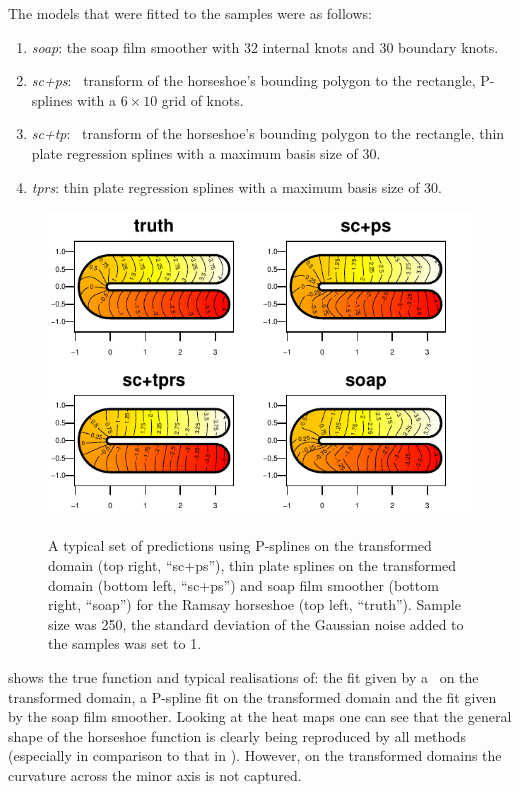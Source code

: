 The models that were fitted to the samples were as follows:
\begin{enumerate}
\item \textit{soap}: the soap film smoother with 32 internal knots and 30 boundary knots.
\item \textit{sc+ps}: \sch\ transform of the horseshoe's bounding polygon to the rectangle, P-splines with a $6 \times 10$ grid of knots.
\item \textit{sc+tp}: \sch\ transform of the horseshoe's bounding polygon to the rectangle, thin plate regression splines with a maximum basis size of 30.
\item \textit{tprs}: thin plate regression splines with a maximum basis size of 30.
\end{enumerate}

\begin{figure}
\centering
\includegraphics[width=6in]{sc/figs/compsmooth.pdf} \\
\caption{A typical set of predictions using P-splines on the transformed domain (top right, ``sc+ps''), thin plate splines on the transformed domain (bottom left, ``sc+ps'') and soap film smoother (bottom right, ``soap'') for the Ramsay horseshoe (top left, ``truth''). Sample size was 250, the standard deviation of the Gaussian noise added to the samples was set to 1.}
\label{compsmooth}
\end{figure}

 shows the true function and typical realisations of: the fit given by a \tprs\ on the transformed domain, a P-spline fit on the transformed domain and the fit given by the soap film smoother. Looking at the heat maps one can see that the general shape of the horseshoe function is clearly being reproduced by all methods (especially in comparison to that in ). However, on the transformed domains the curvature across the minor axis is not captured.

